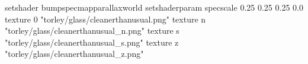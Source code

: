 setshader bumpspecmapparallaxworld
setshaderparam specscale 0.25 0.25 0.25 0.0
texture 0 "torley/glass/cleanerthanusual.png"
texture n "torley/glass/cleanerthanusual_n.png"
texture s "torley/glass/cleanerthanusual_s.png"
texture z "torley/glass/cleanerthanusual_z.png"

